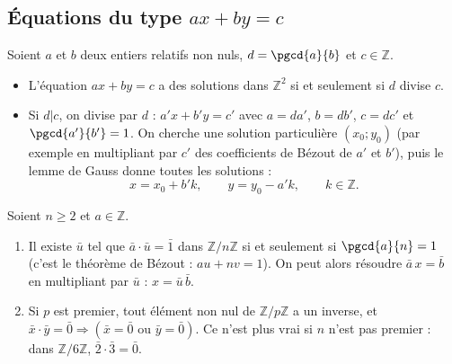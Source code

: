             \subsection*{\'Equations du type $a x + b y = c$}
            Soient $a$ et $b$ deux entiers relatifs non nuls, $d = \pgcd{a}{b}$ et $c \in \mathbb{Z}$.
            \begin{itemize}
                  \item L'\'equation $a x + b y = c$ a des solutions dans $\mathbb{Z}^2$ si et seulement si $d$ divise $c$.
                  \item Si $d | c$, on divise par $d$ : $a' x + b' y = c'$ avec $a = d a'$, $b = d b'$, $c = d c'$ et $\pgcd{a'}{b'} = 1$.
                        On cherche une solution particuli\`ere $(x_0 ; y_0)$ (par exemple en multipliant par $c'$ des coefficients de B\'ezout de $a'$ et $b'$),
                        puis le lemme de Gauss donne toutes les solutions :
                        \[
                              x = x_0 + b' k , \qquad y = y_0 - a' k , \qquad k \in \mathbb{Z} .
                        \]
            \end{itemize}
            \begin{prop}
                  Soient $n \geq 2$ et $a\in\mathbb{Z}$.
                  \begin{enumerate}
                        \item Il existe $\bar{u}$ tel que $\bar{a} \cdot \bar{u} = \bar{1}$ dans $\mathbb{Z}/n\mathbb{Z}$
                              si et seulement si $\pgcd{a}{n} = 1$ (c'est le th\'eor\`eme de B\'ezout : $au + nv = 1$).
                              On peut alors r\'esoudre $\bar{a}\,x = \bar{b}$ en multipliant par $\bar{u}$ : $x = \bar{u}\,\bar{b}$.
                        \item Si $p$ est premier, tout \'el\'ement non nul de $\mathbb{Z}/p\mathbb{Z}$ a un inverse, et
                              $\bar{x} \cdot \bar{y} = \bar{0} \Rightarrow \left( \bar{x} = \bar{0} \text{ ou } \bar{y} = \bar{0} \right)$.
                              Ce n'est plus vrai si $n$ n'est pas premier : dans $\mathbb{Z}/6\mathbb{Z}$, $\bar{2}\cdot\bar{3} = \bar{0}$.
                  \end{enumerate}
            \end{prop}


\TCDLessonStyleOff
\clearpage
\providecommand{\congru}[3]{#1 \equiv #2 \quad \mathrm{mod}\ #3}
\providecommand{\base}[2]{\overline{#1}^{_{(#2)}}} %
